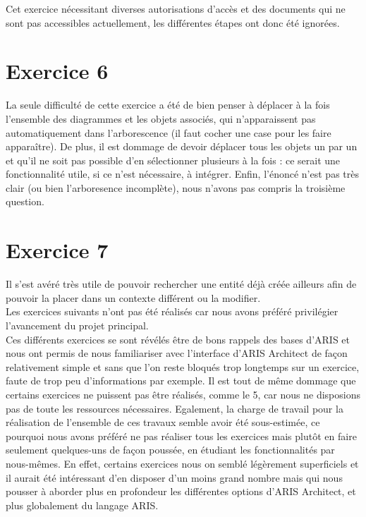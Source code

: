 Cet exercice nécessitant diverses autorisations d'accès et des documents qui ne sont pas accessibles actuellement, les différentes étapes ont donc été ignorées.

\section{Exercice 6}

La seule difficulté de cette exercice a été de bien penser à déplacer à la fois l'ensemble des diagrammes et les objets associés, qui n’apparaissent pas automatiquement dans l'arborescence (il faut cocher une case pour les faire apparaître). De plus, il est dommage de devoir déplacer tous les objets un par un et qu'il ne soit pas possible d'en sélectionner plusieurs à la fois : ce serait une fonctionnalité utile, si ce n'est nécessaire, à intégrer. Enfin, l'énoncé n'est pas très clair (ou bien l'arboresence incomplète), nous n'avons pas compris la troisième question.

\section{Exercice 7}

Il s'est avéré très utile de pouvoir rechercher une entité déjà créée ailleurs afin de pouvoir la placer dans un contexte différent ou la modifier. \\

Les exercices suivants n'ont pas été réalisés car nous avons préféré privilégier l'avancement du projet principal. \\

Ces différents exercices se sont révélés être de bons rappels des bases d'ARIS et nous ont permis de nous familiariser avec l'interface d'ARIS Architect de façon relativement simple et sans que l’on reste bloqués trop longtemps sur un exercice, faute de trop peu d'informations par exemple. Il est tout de même dommage que certains exercices ne puissent pas être réalisés, comme le 5, car nous ne disposions pas de toute les ressources nécessaires. Egalement, la charge de travail pour la réalisation de l'ensemble de ces travaux semble avoir été sous-estimée, ce pourquoi nous avons préféré ne pas réaliser tous les exercices mais plutôt en faire seulement quelques-uns de façon poussée, en étudiant les fonctionnalités par nous-mêmes. En effet, certains exercices nous on semblé légèrement superficiels et il aurait été intéressant d'en disposer d'un moins grand nombre mais qui nous pousser à aborder plus en profondeur les différentes options d'ARIS Architect, et plus globalement du langage ARIS.

